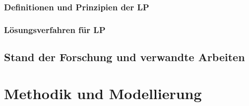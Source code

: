 \documentclass[bachelor, german]{algothesis}
\begin{document}
\subsection{Definitionen und Prinzipien der LP}
\subsection{Lösungsverfahren für LP}


\section{Stand der Forschung und verwandte Arbeiten}


\chapter{Methodik und Modellierung}
\end{document}
